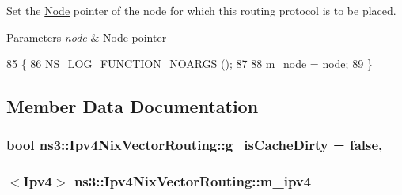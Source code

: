 Set the \hyperlink{classns3_1_1Node}{Node} pointer of the node for which this routing protocol is to be placed. 


\begin{DoxyParams}{Parameters}
{\em node} & \hyperlink{classns3_1_1Node}{Node} pointer \\
\hline
\end{DoxyParams}

\begin{DoxyCode}
85 \{
86   \hyperlink{log-macros-disabled_8h_a8f7e4afc291c9d29a65c18ac1f79197b}{NS\_LOG\_FUNCTION\_NOARGS} ();
87 
88   \hyperlink{classns3_1_1Ipv4NixVectorRouting_a329265b09f4d85bac6ec9bd0ec2daa92}{m\_node} = node;
89 \}
\end{DoxyCode}


\subsection{Member Data Documentation}
\subsubsection[{\texorpdfstring{g\+\_\+is\+Cache\+Dirty}{g_isCacheDirty}}]{\setlength{\rightskip}{0pt plus 5cm}bool ns3\+::\+Ipv4\+Nix\+Vector\+Routing\+::g\+\_\+is\+Cache\+Dirty = {\bf false}\hspace{0.3cm}{\ttfamily [static]}, {\ttfamily [private]}}\hypertarget{classns3_1_1Ipv4NixVectorRouting_a7b75edeb473c9fe1595b59d9800c5bab}{}\label{classns3_1_1Ipv4NixVectorRouting_a7b75edeb473c9fe1595b59d9800c5bab}
\subsubsection[{\texorpdfstring{m\+\_\+ipv4}{m_ipv4}}]{$<${\bf Ipv4}$>$ ns3\+::\+Ipv4\+Nix\+Vector\+Routing\+::m\+\_\+ipv4\hspace{0.3cm}{\ttfamily [private]}}\hypertarget{classns3_1_1Ipv4NixVectorRouting_a215cb71f30d85df9ec7176ca22620519}{}\label{classns3_1_1Ipv4NixVectorRouting_a215cb71f30d85df9ec7176ca22620519}
